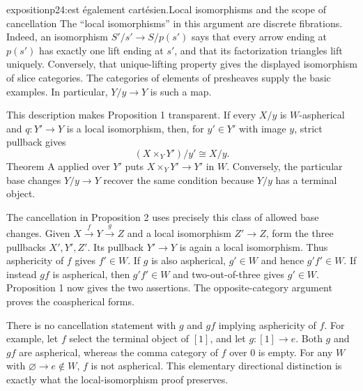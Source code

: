 \begin{dcomment}{exposition}{p24:est également cartésien.}{Local isomorphisms and the scope of cancellation}
The ``local isomorphisms'' in this argument are discrete fibrations. Indeed, an isomorphism $S'/s'\to S/p(s')$ says that every arrow ending at $p(s')$ has exactly one lift ending at $s'$, and that its factorization triangles lift uniquely. Conversely, that unique-lifting property gives the displayed isomorphism of slice categories. The categories of elements of presheaves supply the basic examples. In particular, $Y/y\to Y$ is such a map.

This description makes Proposition 1 transparent. If every $X/y$ is $W$-aspherical and $q:Y'\to Y$ is a local isomorphism, then, for $y'\in Y'$ with image $y$, strict pullback gives
\[
 (X\times_Y Y')/y'\cong X/y.
\]
Theorem A applied over $Y'$ puts $X\times_Y Y'\to Y'$ in $W$. Conversely, the particular base changes $Y/y\to Y$ recover the same condition because $Y/y$ has a terminal object.

The cancellation in Proposition 2 uses precisely this class of allowed base changes. Given $X\xrightarrow fY\xrightarrow gZ$ and a local isomorphism $Z'\to Z$, form the three pullbacks $X',Y',Z'$. Its pullback $Y'\to Y$ is again a local isomorphism. Thus asphericity of $f$ gives $f'\in W$. If $g$ is also aspherical, $g'\in W$ and hence $g'f'\in W$. If instead $gf$ is aspherical, then $g'f'\in W$ and two-out-of-three gives $g'\in W$. Proposition 1 now gives the two assertions. The opposite-category argument proves the coaspherical forms.

There is no cancellation statement with $g$ and $gf$ implying asphericity of $f$. For example, let $f$ select the terminal object of $[1]$, and let $g:[1]\to e$. Both $g$ and $gf$ are aspherical, whereas the comma category of $f$ over $0$ is empty. For any $W$ with $\varnothing\to e\notin W$, $f$ is not aspherical. This elementary directional distinction is exactly what the local-isomorphism proof preserves.
\end{dcomment}

